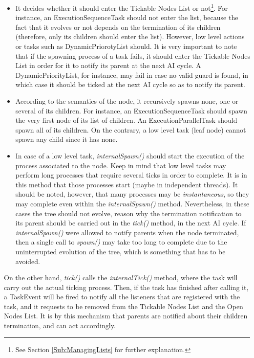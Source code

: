 \documentclass[a4paper,10pt]{article}
\begin{document}
\begin{itemize}
  \item It decides whether it should enter the Tickable Nodes List or not\footnote{See Section \ref{Sub:ManagingLists} for further explanation.}. For instance, an ExecutionSequenceTask should not enter the list, because the fact that it evolves or not depends on the termination of its children (therefore, only its children should enter the list). However, low level actions or tasks such as DynamicPriorotyList should. It is very important to note that if the spawning process of a task fails, it should enter the Tickable Nodes List in order for it to notify its parent at the next AI cycle. A DynamicPriorityList, for instance, may fail in case no valid guard is found, in which case it should be ticked at the next AI cycle so as to notify its parent.

  \item According to the semantics of the node, it recursively spawns none, one or several of its children. For instance, an ExecutionSequenceTask should spawn the very first node of its list of children. An ExecutionParallelTask should spawn all of its children. On the contrary, a low level task (leaf node) cannot spawn any child since it has none.

  \item In case of a low level task, \textit{internalSpawn()} should start the execution of the process associated to the node. Keep in mind that low level tasks may perform long processes that require several ticks in order to complete. It is in this method that those processes start (maybe in independent threads). It should be noted, however, that many processes may be \textit{instantaneous}, so they may complete even within the \textit{internalSpawn()} method. Nevertheless, in these cases the tree should not evolve, reason why the termination notification to its parent should be carried out in the \textit{tick()} method, in the next AI cycle. If \textit{internalSpawn()} were allowed to notify parents when the node terminated, then a single call to \textit{spawn()} may take too long to complete due to the uninterrupted evolution of the tree, which is something that has to be avoided.
\end{itemize}

On the other hand, \textit{tick()} calls the \textit{internalTick()} method, where the task will carry out the actual ticking process. Then, if the task has finished after calling it, a TaskEvent will be fired to notify all the listeners that are registered with the task, and it requests to be removed from the Tickable Nodes List and the Open Nodes List. It is by this mechanism that parents are notified about their children termination, and can act accordingly.
\end{document}
